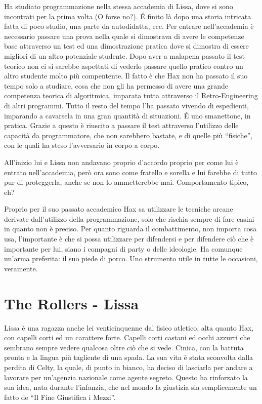 \documentclass[9pt,a4paper,cleardoubleempty]{scrbook}
\begin{document}
        Ha studiato programmazione nella stessa accademia di Lissa, dove si
        sono incontrati per la prima volta (O forse no?). \'E finito là
        dopo una storia intricata fatta di poco studio, una parte da
        autodidatta, ecc. Per entrare nell'accademia è necessario passare
        una prova nella quale si dimostrava di avere le competenze base
        attraverso un test ed una dimostrazione pratica dove si dimostra
        di essere migliori di un altro potenziale studente. Dopo aver a
        malapena passato il test teorico non ci si sarebbe aspettati di
        vederlo passare quello pratico contro un altro studente molto più
        compentente. Il fatto è che Hax non ha passato il suo tempo solo a
        studiare, cosa che non gli ha permesso di avere una grande
        competenza teorica di algoritmica, imparata tutta attraverso il
        Retro-Engineering di altri programmi. Tutto il resto del tempo l'ha
        passato vivendo di espedienti, imparando a cavarsela in una gran
        quantità di situazioni. \'E uno smanettone, in pratica. Grazie a
        questo è riuscito a passare il test attraverso l'utilizzo delle
        capacità da programmatore, che non sarebbero bastate, e di quelle
        più ``fisiche'', con le quali ha steso l'avversario in corpo a
        corpo. 

        All'inizio lui e Lissa non andavano proprio d'accordo proprio per
        come lui è entrato nell'accademia, però ora sono come fratello e
        sorella e lui farebbe di tutto pur di proteggerla, anche se non lo
        ammetterebbe mai. Comportamento tipico, eh?

        Proprio per il suo passato accademico Hax sa utilizzare le tecniche
        arcane derivate dall'utilizzo della programmazione, solo che
        rischia sempre di fare casini in quanto non è preciso. Per quanto
        riguarda il combattimento, non importa cosa usa, l'importante è che
        si possa utilizzare per difendersi e per difendere ciò che è
        importante per lui, siano i compagni di party o delle ideologie. Ha
        comunque un'arma preferita: il suo piede di porco. Uno strumento
        utile in tutte le occasioni, veramente.

    \section{The Rollers - Lissa}
        Lissa è una ragazza anche lei venticinquenne dal fisico atletico,
        alta quanto Hax, con
        capelli corti ed un carattere forte. Capelli corti castani ed
        occhi azzurri che sembrano sempre vedere qualcosa oltre ciò che si
        vede. Cinica, con la battuta pronta e la lingua più tagliente di
        una spada. La sua vita è stata sconvolta dalla perdita di Celty, la
        quale, di punto in bianco, ha deciso di lasciarla per andare a
        lavorare per un'agenzia nazionale come agente segreto. Questo ha
        rinforzato la sua idea, nata durante l'infanzia, che nel mondo la
        giustizia sia semplicemente un fatto de ``Il Fine Giustifica i
        Mezzi''.
\end{document}
